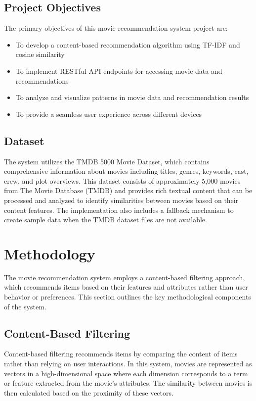 \documentclass[12pt,a4paper]{article}
\begin{document}
\subsection{Project Objectives}

The primary objectives of this movie recommendation system project are:

\begin{itemize}
    \item To develop a content-based recommendation algorithm using TF-IDF and cosine similarity
    \item To implement RESTful API endpoints for accessing movie data and recommendations
    \item To analyze and visualize patterns in movie data and recommendation results
    \item To provide a seamless user experience across different devices
\end{itemize}

\subsection{Dataset}

The system utilizes the TMDB 5000 Movie Dataset, which contains comprehensive information about movies including titles, genres, keywords, cast, crew, and plot overviews. This dataset consists of approximately 5,000 movies from The Movie Database (TMDB) and provides rich textual content that can be processed and analyzed to identify similarities between movies based on their content features. The implementation also includes a fallback mechanism to create sample data when the TMDB dataset files are not available.

\section{Methodology}

The movie recommendation system employs a content-based filtering approach, which recommends items based on their features and attributes rather than user behavior or preferences. This section outlines the key methodological components of the system.

\subsection{Content-Based Filtering}

Content-based filtering recommends items by comparing the content of items rather than relying on user interactions. In this system, movies are represented as vectors in a high-dimensional space where each dimension corresponds to a term or feature extracted from the movie's attributes. The similarity between movies is then calculated based on the proximity of these vectors.
\end{document}

